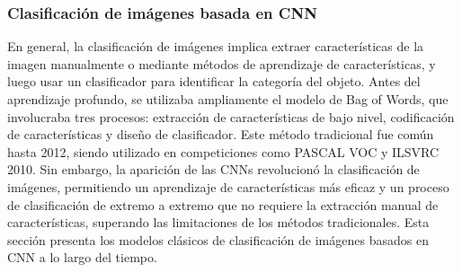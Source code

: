  \subsubsection{Clasificación de imágenes basada en CNN}
 En general, la clasificación de imágenes implica extraer características de la imagen manualmente o mediante métodos de aprendizaje de características, y luego usar un clasificador para identificar la categoría del objeto. Antes del aprendizaje profundo, se utilizaba ampliamente el modelo de Bag of Words, que involucraba tres procesos: extracción de características de bajo nivel, codificación de características y diseño de clasificador. Este método tradicional fue común hasta 2012, siendo utilizado en competiciones como PASCAL VOC y ILSVRC 2010. Sin embargo, la aparición de las CNNs revolucionó la clasificación de imágenes, permitiendo un aprendizaje de características más eficaz y un proceso de clasificación de extremo a extremo que no requiere la extracción manual de características, superando las limitaciones de los métodos tradicionales. Esta sección presenta los modelos clásicos de clasificación de imágenes basados en CNN a lo largo del tiempo.
 
 

